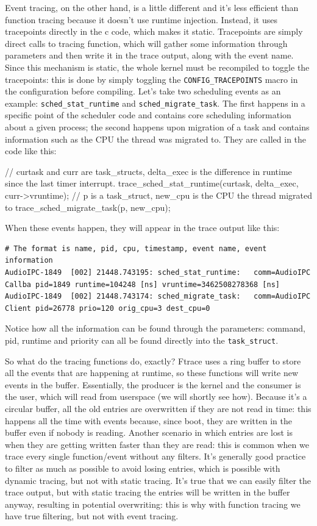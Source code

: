 \documentclass[10pt]{book}
\begin{document}
Event tracing, on the other hand, is a little different and it's less efficient than function tracing because it doesn't use runtime injection. Instead, it uses tracepoints directly in the c code, which makes it static. Tracepoints are simply direct calls to tracing function, which will gather some information through parameters and then write it in the trace output, along with the event name. Since this mechanism is static, the whole kernel must be recompiled to toggle the tracepoints: this is done by simply toggling the \verb|CONFIG_TRACEPOINTS| macro in the configuration before compiling. Let's take two scheduling events as an example: \verb|sched_stat_runtime| and \verb|sched_migrate_task|. The first happens in a specific point of the scheduler code and contains core scheduling information about a given process; the second happens upon migration of a task and contains information such as the CPU the thread was migrated to. They are called in the code like this:
\begin{code}
// curtask and curr are task_structs, delta_exec is the difference in runtime since the last timer interrupt. 
trace_sched_stat_runtime(curtask, delta_exec, curr->vruntime);
// p is a task_struct, new_cpu is the CPU the thread migrated to
trace_sched_migrate_task(p, new_cpu);
\end{code}
When these events happen, they will appear in the trace output like this:
\begin{Verbatim}
# The format is name, pid, cpu, timestamp, event name, event information 
AudioIPC-1849  [002] 21448.743195: sched_stat_runtime:   comm=AudioIPC Callba pid=1849 runtime=104248 [ns] vruntime=3462508278368 [ns]
AudioIPC-1849  [002] 21448.743174: sched_migrate_task:   comm=AudioIPC Client pid=26778 prio=120 orig_cpu=3 dest_cpu=0
\end{Verbatim} 

Notice how all the information can be found through the parameters: command, pid, runtime and priority can all be found directly into the \verb|task_struct|.

So what do the tracing functions do, exactly? Ftrace uses a ring buffer to store all the events that are happening at runtime, so these functions will write new events in the buffer. Essentially, the producer is the kernel and the consumer is the user, which will read from userspace (we will shortly see how). Because it's a circular buffer, all the old entries are overwritten if they are not read in time: this happens all the time with events because, since boot, they are written in the buffer even if nobody is reading. Another scenario in which entries are lost is when they are getting written faster than they are read: this is common when we trace every single function/event without any filters. It's generally good practice to filter as much as possible to avoid losing entries, which is possible with dynamic tracing, but not with static tracing. It's true that we can easily filter the trace output, but with static tracing the entries will be written in the buffer anyway, resulting in potential overwriting: this is why with function tracing we have true filtering, but not with event tracing.
\end{document}
